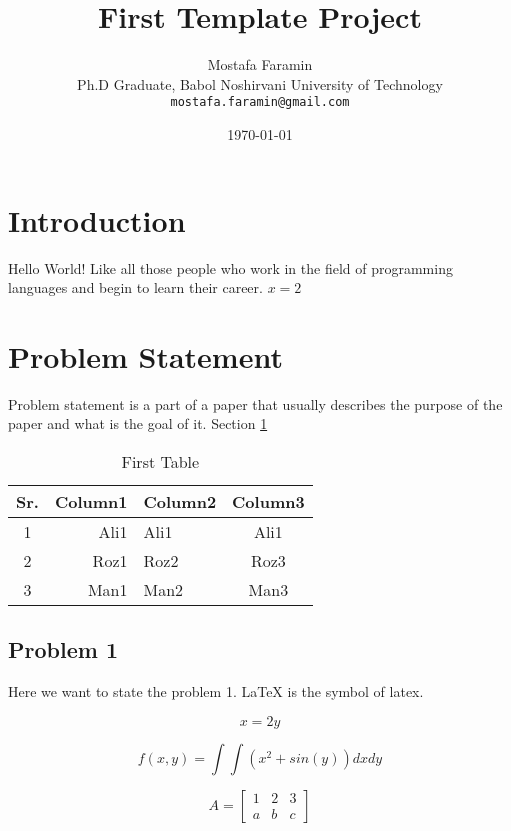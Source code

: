 \documentclass[two column]{article}
\title{First Template Project}
\author{Mostafa Faramin\\
Ph.D Graduate, Babol Noshirvani University of Technology\\
\texttt{mostafa.faramin@gmail.com}}
\date{\today}
\begin{document}
\maketitle

\section{Introduction} \label{section.intro} 

Hello World! Like all those people who work in the field of programming languages and begin to learn their career. $x = 2$

\section{Problem Statement} \label{section.prolem}

Problem statement is a part of a paper that usually describes the purpose of the paper and what is the goal of it. Section \ref{section.intro}

\begin{table}[H]
    \centering
    \scalebox{1}  %
    {
    \begin{tabular}{c|||r|l|c|}
    \hline
    Sr. & Column1 & Column2 & Column3 \\
    \hline
    1 & Ali1 & Ali1 & Ali1\\
    2 & Roz1 & Roz2 & Roz3\\
    \hline
    3 & Man1 & Man2 & Man3 \\
    \hline
    \end{tabular}
    }
    \caption{First Table}
    \label{tab:my_label}
\end{table}

\subsection{Problem 1} \label{subsection.problem1}

Here we want to state the problem 1. \LaTeX{} is the symbol of latex. 

\begin{equation}
    x = 2y
\end{equation}

\begin{equation}
    f(x,y) = \int{\int{(x^2 + sin(y))} dx} dy
\end{equation}

\begin{equation}
A =
    \begin{bmatrix}
    1 & 2 & 3\\
    a & b & c
    \end{bmatrix}
\end{equation}
\end{document}
